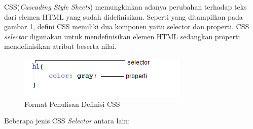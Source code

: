 CSS(\textit{Cascading Style Sheets}) memungkinkan adanya perubahan terhadap teks dari elemen HTML yang sudah didefinisikan\cite{Meyer:2012}. Seperti yang ditampilkan pada gambar \ref{fig:2_selector_ex}, defini CSS memiliki dua komponen yaitu selector dan properti. CSS \textit{selector} digunakan untuk mendefinisikan elemen HTML sedangkan properti mendefinisikan atribut beserta nilai. 
		\begin{figure}[H]
			\centering
			\includegraphics[scale=0.8]{Gambar/selector-ex}
			\caption{Format Penulisan Definisi CSS} 
			\label{fig:2_selector_ex}
		\end{figure}
Beberapa jenis CSS \textit{Selector} antara lain:
